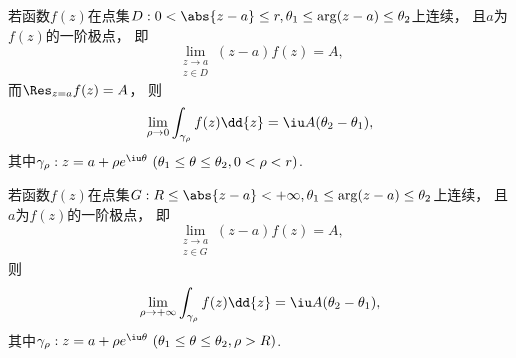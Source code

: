 \begin{lemma}\label{theorem:留数定理.计算积分路径上没有奇点的无穷限积分.引理1}
若函数\(f(z)\)在点集\(D: 0<\abs{z-a}\leq r, \theta_1 \leq \arg(z-a) \leq \theta_2\)上连续，
且\(a\)为\(f(z)\)的一阶极点，
即\begin{equation}
	\lim_{\substack{z \to a \\ z \in D}} (z-a) f(z) = A,
\end{equation}
而\(\Res_{z=a} f(z) = A\)，
则\begin{equation}
	\lim_{\rho\to0} \int_{\gamma_{\rho}} f(z) \dd{z}
	= \iu A (\theta_2-\theta_1),
\end{equation}
其中\(\gamma_{\rho}: z=a+\rho e^{\iu\theta}\ (\theta_1 \leq \theta \leq \theta_2, 0 < \rho < r)\).

若函数\(f(z)\)在点集\(G: R \leq \abs{z-a} < +\infty, \theta_1 \leq \arg(z-a) \leq \theta_2\)上连续，
且\(a\)为\(f(z)\)的一阶极点，
即\begin{equation}
	\lim_{\substack{z \to a \\ z \in G}} (z-a) f(z) = A,
\end{equation}
则\begin{equation}
	\lim_{\rho\to+\infty} \int_{\gamma_{\rho}} f(z) \dd{z}
	= \iu A (\theta_2-\theta_1),
\end{equation}
其中\(\gamma_{\rho}: z=a+\rho e^{\iu\theta}\ (\theta_1 \leq \theta \leq \theta_2, \rho > R)\).
\end{lemma}

